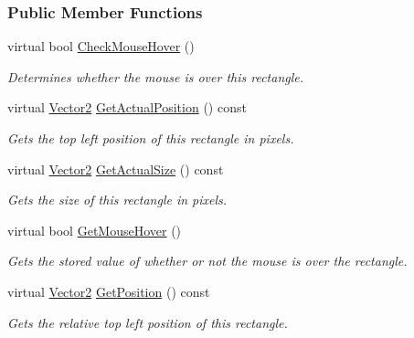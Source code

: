 \subsubsection*{Public Member Functions}
\begin{DoxyCompactItemize}
\item 
virtual bool \hyperlink{classMezzanine_1_1UI_1_1Rectangle_ad4d0f9a0e2a445acea1ef0a2d1edfc09}{CheckMouseHover} ()
\begin{DoxyCompactList}\small\item\em Determines whether the mouse is over this rectangle. \item\end{DoxyCompactList}\item 
virtual \hyperlink{classMezzanine_1_1Vector2}{Vector2} \hyperlink{classMezzanine_1_1UI_1_1Rectangle_a642bbe279ac7c4473f8449e58f61ac31}{GetActualPosition} () const 
\begin{DoxyCompactList}\small\item\em Gets the top left position of this rectangle in pixels. \item\end{DoxyCompactList}\item 
virtual \hyperlink{classMezzanine_1_1Vector2}{Vector2} \hyperlink{classMezzanine_1_1UI_1_1Rectangle_a172e2725569b4d5c234349fe5b797d2b}{GetActualSize} () const 
\begin{DoxyCompactList}\small\item\em Gets the size of this rectangle in pixels. \item\end{DoxyCompactList}\item 
virtual bool \hyperlink{classMezzanine_1_1UI_1_1Rectangle_aa55d6bb667692c4b94bbc8c749851e76}{GetMouseHover} ()
\begin{DoxyCompactList}\small\item\em Gets the stored value of whether or not the mouse is over the rectangle. \item\end{DoxyCompactList}\item 
virtual \hyperlink{classMezzanine_1_1Vector2}{Vector2} \hyperlink{classMezzanine_1_1UI_1_1Rectangle_a8df1f5fbba85a0a6f252ae470ce93c07}{GetPosition} () const 
\begin{DoxyCompactList}\small\item\em Gets the relative top left position of this rectangle. \item\end{DoxyCompactList}\item 

\end{DoxyCompactItemize}
